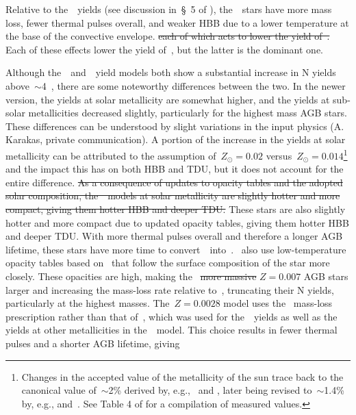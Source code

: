 \documentclass[ms.tex]{subfiles}
\begin{document}
Relative to the~\karakas~yields (see discussion in~\S~5 of
\citealp{Karakas2016}), the~\cristallo~stars have more mass loss, fewer
thermal pulses overall, and weaker HBB due to a lower temperature at the base
of the convective envelope. 
{\color{red} \sout{each of which acts to lower the yield of~\Nfourteen.}
Each of these effects lower the yield of~\Nfourteen, but the latter is the
dominant one.}
\par
Although the~\karakasten~and~\karakas~yield models both show a substantial
increase in N yields above~$\sim$4~\msun, there are some noteworthy differences
between the two.
In the newer version, the yields at solar metallicity are somewhat higher,
and the yields at sub-solar metallicities decreased slightly, particularly for
the highest mass AGB stars.
These differences can be understood by slight variations in the input physics
(A. Karakas, private communication).
A portion of the increase in the yields at solar metallicity can be attributed
to the assumption of~$Z_\odot = 0.02$ versus~$Z_\odot = 0.014$\footnote{
	Changes in the accepted value of the metallicity of the sun trace back to
	the canonical value of~$\sim$2\% derived by, e.g.,~\citet{Anders1989} and
	\citet{Grevesse1998}, later being revised to~$\sim$1.4\% by, e.g.,
	\citet{Lodders2003} and~\citet*{Asplund2005}. See Table 4 of
	\citet{Asplund2009} for a compilation of measured values.
} and the impact this has on both HBB and TDU, but it does not account for the
entire difference.
{\color{red}
\sout{
As a consequence of updates to opacity tables and the adopted solar composition,
the~\karakas~models at solar metallicity are slightly hotter and more compact,
giving them hotter HBB and deeper TDU.
}
These stars are also slightly hotter and more compact due to updated opacity
tables, giving them hotter HBB and deeper TDU.
}
With more thermal pulses overall and therefore a longer AGB lifetime, these
stars have more time to convert~\Ctwelve~into~\Nfourteen.
\karakas~also use low-temperature opacity tables based on~\citet{Marigo2002}
that follow the surface composition of the star more closely.
These opacities are high, making the~{\color{red} \sout{more massive}
$Z = 0.007$} AGB stars larger and increasing the mass-loss rate relative
to~\karakasten, truncating their N yields, {\color{red} particularly at the
highest masses.}
The~$Z = 0.0028$ model uses the~\citet{Bloecker1995} mass-loss prescription
rather than that of~\citet{Vassiliadis1993}, which was used for
the~\karakasten~yields as well as the yields at other metallicities in
the~\karakas~model.
This choice results in fewer thermal pulses and a shorter AGB lifetime, giving
\end{document}
